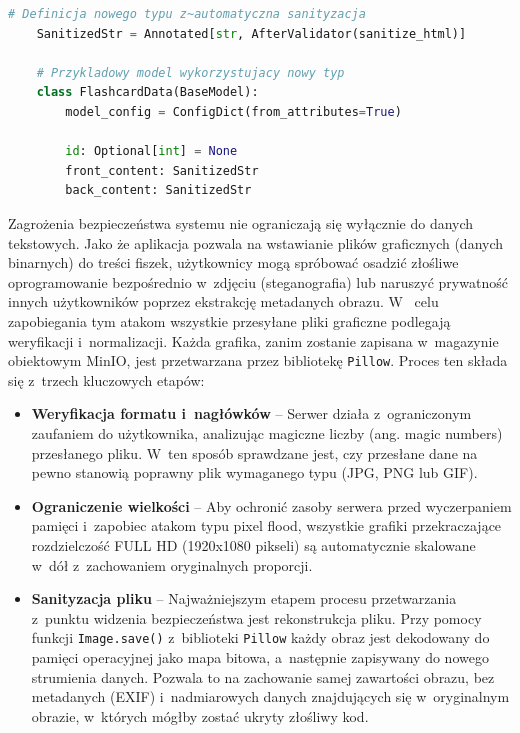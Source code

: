 \begin{lstlisting}[language=Python,
	caption={Automatyczna sanityzacja w~modelach Pydantic},
	label={lst:sanityzacja}]
    # Definicja nowego typu z~automatyczna sanityzacja
    SanitizedStr = Annotated[str, AfterValidator(sanitize_html)]

    # Przykladowy model wykorzystujacy nowy typ
    class FlashcardData(BaseModel):
        model_config = ConfigDict(from_attributes=True)

        id: Optional[int] = None
        front_content: SanitizedStr
        back_content: SanitizedStr
\end{lstlisting} 
Zagrożenia bezpieczeństwa systemu nie ograniczają się wyłącznie do danych tekstowych. Jako że aplikacja pozwala na 
wstawianie plików graficznych (danych binarnych) do treści fiszek, użytkownicy mogą spróbować osadzić złośliwe oprogramowanie 
bezpośrednio w~zdjęciu (steganografia) lub naruszyć prywatność innych użytkowników poprzez ekstrakcję metadanych obrazu. W~
celu zapobiegania tym atakom wszystkie przesyłane pliki graficzne podlegają weryfikacji i~normalizacji. Każda grafika, zanim 
zostanie zapisana w~magazynie obiektowym MinIO, jest przetwarzana przez bibliotekę \texttt{Pillow}. Proces ten 
składa się z~trzech kluczowych etapów:
\begin{itemize}
    \item \textbf{Weryfikacja formatu i~nagłówków} -- Serwer działa z~ograniczonym zaufaniem do użytkownika, 
    analizując magiczne liczby (ang. magic numbers) przesłanego pliku. W~ten sposób sprawdzane jest, czy przesłane dane na 
    pewno stanowią poprawny plik wymaganego typu (JPG, PNG lub GIF).
    \item \textbf{Ograniczenie wielkości} -- Aby ochronić zasoby serwera przed wyczerpaniem pamięci i~zapobiec atakom typu 
    pixel flood, wszystkie grafiki przekraczające rozdzielczość FULL HD (1920x1080 pikseli) są automatycznie skalowane w~dół 
    z~zachowaniem oryginalnych proporcji. 
    \item \textbf{Sanityzacja pliku} -- Najważniejszym etapem procesu przetwarzania z~punktu widzenia bezpieczeństwa jest 
    rekonstrukcja pliku. Przy pomocy funkcji \texttt{Image.save()} z~biblioteki \texttt{Pillow} każdy obraz jest dekodowany do pamięci operacyjnej jako mapa bitowa, a~następnie zapisywany do nowego 
    strumienia danych. Pozwala to na zachowanie samej zawartości obrazu, bez metadanych (EXIF) i~nadmiarowych danych znajdujących 
    się w~oryginalnym obrazie, w~których mógłby zostać ukryty złośliwy kod.
\end{itemize}

